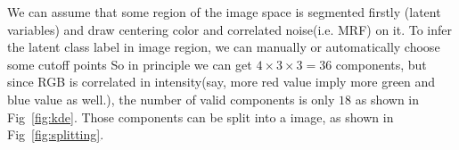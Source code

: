 \documentclass{beamer}
\begin{document}
\begin{frame}
  
  We can assume that some region of the image space is segmented firstly (latent variables) 
  and draw centering color and correlated noise(i.e. MRF) on it. 
  To infer the latent class label in image region,
  we can 
  manually or automatically choose some cutoff points
  So in principle we can get $4\times 3\times 3=36$ components, 
  but since RGB is correlated in intensity(say, more red value imply more green and blue value as well.), 
  the number of valid components is only $18$ as shown in Fig~\ref{fig:kde}.
  Those components can be split into a image, as shown in Fig~\ref{fig:splitting}. 
  

\end{frame}
\end{document}
